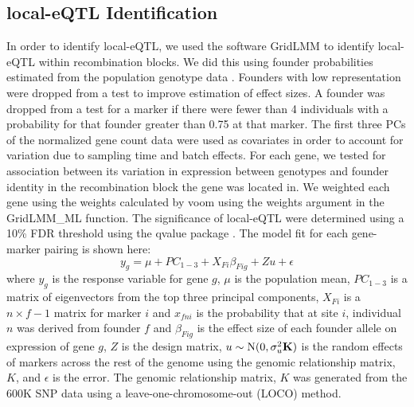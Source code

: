 \documentclass[article,9pt,twocolumn,twoside]{rilabRxiv}
\begin{document}
\subsection{local-eQTL Identification}
In order to identify local-eQTL, we used the software GridLMM \citep{Runcie1} to identify local-eQTL within recombination blocks.
We did this using founder probabilities estimated from the population genotype data \citep{Odell}.
Founders with low representation were dropped from a test to improve estimation of effect sizes.
A founder was dropped from a test for a marker if there were fewer than 4 individuals with a probability for that founder greater than 0.75 at that marker.
The first three PCs of the normalized gene count data were used as covariates in order to account for variation due to sampling time and batch effects.
For each gene, we tested for association between its variation in expression between genotypes and founder identity in the recombination block the gene was located in.
We weighted each gene using the weights calculated by voom using the weights argument in the GridLMM\_ML function.
The significance of local-eQTL were determined using a 10\% FDR threshold using the qvalue package \citep{Storey}.
The model fit for each gene-marker pairing is shown here:
    \begin{equation}
    \label{eqn:gridlmm2}
    y_g = \mu + PC_{1-3} + X_{Fi}{\beta_{Fig}} + Zu + \epsilon
    \end{equation}
    where $y_g$ is the response variable for gene $g$, $\mu$ is the population mean, $PC_{1-3}$ is a matrix of eigenvectors from the top three principal components, $X_{Fi}$ is a $n \times f-1$ matrix for marker $i$ and $x_{fni}$ is the probability that at site $i$, individual $n$ was derived from founder $f$ and $\beta_{Fig}$ is the effect size of each founder allele on expression of gene $g$, $Z$ is the design matrix, $u \sim \mbox{N}(0,\sigma^2_u \bf{K})$ is the random effects of markers across the rest of the genome using the genomic relationship matrix, $K$, and $\epsilon$ is the error.
The genomic relationship matrix, $K$ was generated from the 600K SNP data using a leave-one-chromosome-out (LOCO) method.
\end{document}
